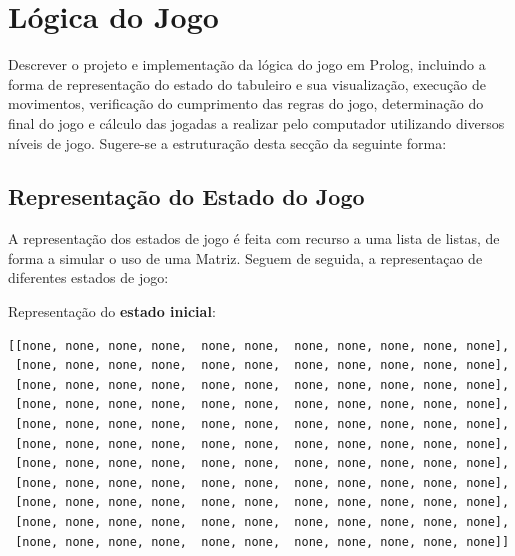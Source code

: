 \documentclass[a4paper]{article}
\begin{document}
\newpage

\section{Lógica do Jogo}

Descrever o projeto e implementação da lógica do jogo em Prolog, incluindo a forma de representação do estado do tabuleiro e sua visualização, execução de movimentos, verificação do cumprimento das regras do jogo, determinação do final do jogo e cálculo das jogadas a realizar pelo computador utilizando diversos níveis de jogo. Sugere-se a estruturação desta secção da seguinte forma:

\subsection{Representação do Estado do Jogo}

A representação dos estados de jogo é feita com recurso a uma lista de listas, de forma a simular o uso de uma Matriz. Seguem de seguida, a representaçao de diferentes estados de jogo:\newline



Representação do \textbf{estado inicial}:

\begin{small}
\begin{lstlisting}
[[none, none, none, none,  none, none,  none, none, none, none, none],
 [none, none, none, none,  none, none,  none, none, none, none, none],
 [none, none, none, none,  none, none,  none, none, none, none, none],
 [none, none, none, none,  none, none,  none, none, none, none, none],
 [none, none, none, none,  none, none,  none, none, none, none, none],
 [none, none, none, none,  none, none,  none, none, none, none, none],
 [none, none, none, none,  none, none,  none, none, none, none, none],
 [none, none, none, none,  none, none,  none, none, none, none, none],
 [none, none, none, none,  none, none,  none, none, none, none, none],
 [none, none, none, none,  none, none,  none, none, none, none, none],
 [none, none, none, none,  none, none,  none, none, none, none, none]]
\end{lstlisting}
\end{small}
\end{document}

